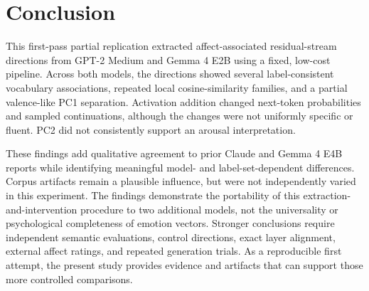 \section{Conclusion}

This first-pass partial replication extracted affect-associated residual-stream directions from GPT-2 Medium and Gemma 4 E2B using 
a fixed, low-cost pipeline. Across both models, the directions showed several label-consistent vocabulary associations, repeated 
local cosine-similarity families, and a partial valence-like PC1 separation. Activation addition changed next-token probabilities 
and sampled continuations, although the changes were not uniformly specific or fluent. PC2 did not consistently support an arousal 
interpretation.

These findings add qualitative agreement to prior Claude and Gemma 4 E4B reports while identifying meaningful model- and label-set-dependent 
differences. Corpus artifacts remain a plausible influence, but were not independently varied in this experiment. The findings demonstrate 
the portability of this extraction-and-intervention procedure to two additional models, not the universality 
or psychological completeness of emotion vectors. Stronger conclusions require independent semantic evaluations, control directions, 
exact layer alignment, external affect ratings, and repeated generation trials. As a reproducible first attempt, the present study 
provides evidence and artifacts that can support those more controlled comparisons.
